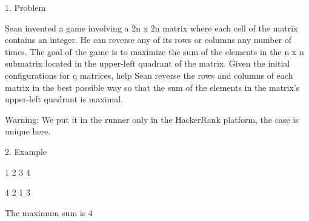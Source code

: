 1. Problem

Sean invented a game involving a  2n x 2n matrix where each cell of the matrix contains an integer. He can reverse any of its rows or columns any number of times. 
The goal of the game is to maximize the sum of the elements in the n x n submatrix located in the upper-left quadrant of the matrix.
Given the initial configurations for q matrices, help Sean reverse the rows and columns of each matrix in the best possible way so 
that the sum of the elements in the matrix's upper-left quadrant is maximal.

Warning: We put it in the runner only in the HackerRank platform, the case is unique here.


2. Example

1 2 
3 4

4 2
1 3  

The maximum sum is 4
